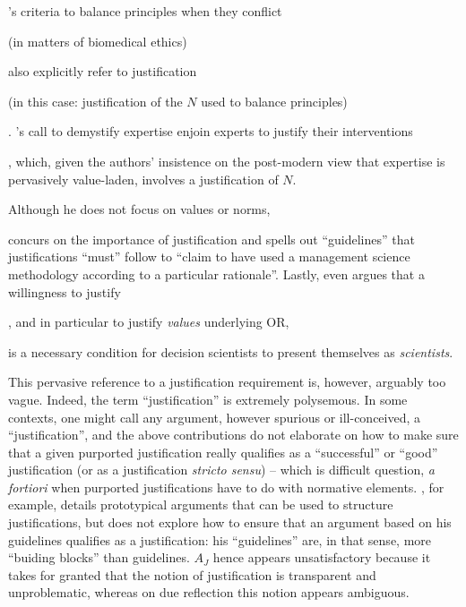 \documentclass[preprint, french, english, 11pt, authoryear]{elsarticle}%
\newcommand{\possessivecite}[1]{\citeauthor{#1}’s \citeyearpar{#1}}
\begin{document}
 \possessivecite{beauchamp_principles_2009} criteria to balance principles when they conflict \begin{changebar}(in matters of biomedical ethics)\end{changebar} also explicitly refer to justification \begin{changebar}(in this case: justification of the $N$ used to balance principles)\end{changebar}.
\possessivecite{white_death_1994} call to demystify expertise enjoin experts to justify their interventions\begin{changebar}, which, given the authors' insistence on the post-modern view that expertise is pervasively value-laden, involves a justification of $N$.\end{changebar}
\begin{changebar}Although he does not focus on values or norms,\end{changebar} \citet{jackson_towards_1999} concurs on the importance of justification and spells out ``guidelines'' that justifications ``must'' follow to “claim to have used a management science methodology according to a particular rationale''.
Lastly, \citet{ormerod_justifying_2010} even argues that a willingness to justify\begin{changebar}, and in particular to justify \emph{values} underlying OR,\end{changebar} is a necessary condition for decision scientists to present themselves as \emph{scientists}.

 
This pervasive reference to a justification requirement is, however, arguably too vague. Indeed, the term ``justification'' is extremely polysemous. 
In some contexts, one might call any argument, however spurious or ill-conceived, a ``justification'', and the above contributions do not elaborate on how to make sure that a given purported justification really qualifies as a ``successful'' or ``good'' justification (or as a justification \emph{stricto sensu}) -- which is difficult question, \emph{a fortiori} when purported justifications have to do with normative elements.
\citet{jackson_towards_1999}, for example, details prototypical arguments that can be used to structure justifications, but does not explore how to ensure that an argument based on his guidelines qualifies as a justification: his ``guidelines'' are, in that sense, more ``buiding blocks'' than guidelines. 
$A_J$ hence appears unsatisfactory because it takes for granted that the notion of justification is transparent and unproblematic, whereas on due reflection this notion appears ambiguous.
\end{document}
